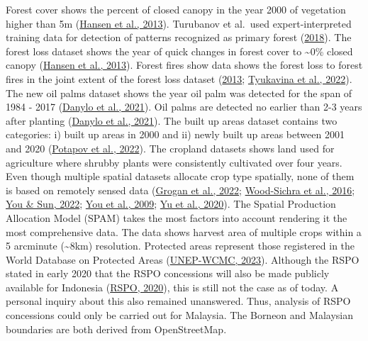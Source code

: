 \documentclass[
  letterpaper,
  DIV=11,
  numbers=noendperiod]{scrreprt}
\begin{document}
Forest cover shows the percent of closed canopy in the year 2000 of
vegetation higher than 5m
(\protect\hyperlink{ref-hansenHighResolutionGlobalMaps2013}{Hansen et
al., 2013}). Turubanov et al.~used expert-interpreted training data for
detection of patterns recognized as primary forest
(\protect\hyperlink{ref-turubanovaOngoingPrimaryForest2018}{2018}). The
forest loss dataset shows the year of quick changes in forest cover to
\textasciitilde0\% closed canopy
(\protect\hyperlink{ref-hansenHighResolutionGlobalMaps2013}{Hansen et
al., 2013}). Forest fires show data shows the forest loss to forest
fires in the joint extent of the forest loss dataset
(\protect\hyperlink{ref-hansenHighResolutionGlobalMaps2013}{2013};
\protect\hyperlink{ref-tyukavinaGlobalTrendsForest2022}{Tyukavina et
al., 2022}). The new oil palms dataset shows the year oil palm was
detected for the span of 1984 - 2017
(\protect\hyperlink{ref-danyloMapExtentYear2021}{Danylo et al., 2021}).
Oil palms are detected no earlier than 2-3 years after planting
(\protect\hyperlink{ref-danyloMapExtentYear2021}{Danylo et al., 2021}).
The built up areas dataset contains two categories: i) built up areas in
2000 and ii) newly built up areas between 2001 and 2020
(\protect\hyperlink{ref-potapovGlobal20002020Land2022}{Potapov et al.,
2022}). The cropland datasets shows land used for agriculture where
shrubby plants were consistently cultivated over four years. Even though
multiple spatial datasets allocate crop type spatially, none of them is
based on remotely sensed data
(\protect\hyperlink{ref-groganGlobalGriddedCrop2022}{Grogan et al.,
2022};
\protect\hyperlink{ref-wood-sichraSpatialProductionAllocation2016}{Wood-Sichra
et al., 2016}; \protect\hyperlink{ref-youMappingGlobalCropping2022}{You
\& Sun, 2022};
\protect\hyperlink{ref-youGeneratingPlausibleCrop2009}{You et al.,
2009}; \protect\hyperlink{ref-yuCultivatedPlanet20102020}{Yu et al.,
2020}). The Spatial Production Allocation Model (SPAM) takes the most
factors into account rendering it the most comprehensive data. The data
shows harvest area of multiple crops within a 5 arcminute
(\textasciitilde8km) resolution. Protected areas represent those
registered in the World Database on Protected Areas
(\protect\hyperlink{ref-unep-wcmcProtectedAreaProfile2023}{UNEP-WCMC,
2023}). Although the RSPO stated in early 2020 that the RSPO concessions
will also be made publicly available for Indonesia
(\protect\hyperlink{ref-rspoRSPOMEMBERSCONCESSION2020}{RSPO, 2020}),
this is still not the case as of today. A personal inquiry about this
also remained unanswered. Thus, analysis of RSPO concessions could only
be carried out for Malaysia. The Borneon and Malaysian boundaries are
both derived from OpenStreetMap.
\end{document}
